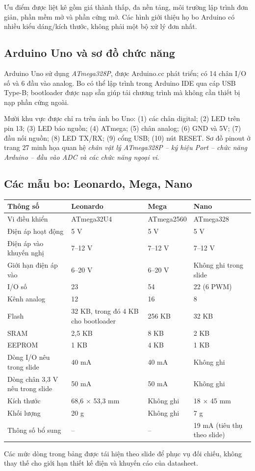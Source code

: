 Ưu điểm được liệt kê gồm giá thành thấp, đa nền tảng, môi trường lập trình đơn giản, phần mềm mở và phần cứng mở. Các hình giới thiệu họ bo Arduino có nhiều kiểu dáng/kích thước, không phải một bộ xử lý đơn nhất.
\subsection{Arduino Uno và sơ đồ chức năng}
Arduino Uno sử dụng \emph{ATmega328P}, được Arduino.cc phát triển; có 14 chân I/O số và 6 đầu vào analog. Bo có thể lập trình trong Arduino IDE qua cáp USB Type-B; bootloader được nạp sẵn giúp tải chương trình mà không cần thiết bị nạp phần cứng ngoài.

Mười khu vực được chỉ ra trên ảnh bo Uno: (1) các chân digital; (2) LED trên pin 13; (3) LED báo nguồn; (4) ATmega; (5) chân analog; (6) GND và 5V; (7) đầu nối nguồn; (8) LED TX/RX; (9) cổng USB; (10) nút RESET. Sơ đồ pinout ở trang 27 minh họa quan hệ \emph{chân vật lý ATmega328P -- ký hiệu Port -- chức năng Arduino -- đầu vào ADC và các chức năng ngoại vi}.
\subsection{Các mẫu bo: Leonardo, Mega, Nano}
\begin{longtable}{>{\raggedright\arraybackslash}p{.28\linewidth}p{.20\linewidth}p{.22\linewidth}p{.20\linewidth}}\toprule\textbf{Thông số} & \textbf{Leonardo} & \textbf{Mega} & \textbf{Nano}\\\midrule\endhead
Vi điều khiển & ATmega32U4 & ATmega2560 & ATmega328\\
Điện áp hoạt động & 5 V & 5 V & 5 V\\
Điện áp vào khuyến nghị & 7--12 V & 7--12 V & 7--12 V\\
Giới hạn điện áp vào & 6--20 V & 6--20 V & Không ghi trong slide\\
I/O số & 23 & 54 & 22 (6 PWM)\\
Kênh analog & 12 & 16 & 8\\
Flash & 32 KB, trong đó 4 KB cho bootloader & 256 KB & 32 KB\\
SRAM & 2,5 KB & 8 KB & 2 KB\\
EEPROM & 1 KB & 4 KB & 1 KB\\
Dòng I/O nêu trong slide & 40 mA & 40 mA & Không ghi\\
Dòng chân 3,3 V nêu trong slide & 50 mA & 50 mA & Không ghi\\
Kích thước & 68,6 $\times$ 53,3 mm & Không ghi & 18 $\times$ 45 mm\\
Khối lượng & 20 g & Không ghi & 7 g\\
Thông số bổ sung & -- & -- & 19 mA (tiêu thụ theo slide)\\\bottomrule\end{longtable}
Các mức dòng trong bảng được tái hiện theo slide để phục vụ đối chiếu, không thay thế cho giới hạn thiết kế điện và khuyến cáo của datasheet.
